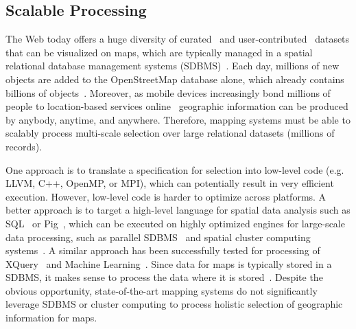 \documentclass[11pt, oneside]{report}
\begin{document}
{%
\subsection{Scalable Processing}
\label{sec:introduction:problem:statement:three}
The Web today offers a huge diversity of curated~\cite{gst2014digitalmapsupply} and user-contributed~\cite{openstreetmap,twitter2014twitter,zooniverse2014oldweather} datasets that can be visualized on maps, which are typically managed in a spatial relational database management systems (SDBMS)~\cite{wu2014case}. Each day, millions of new objects are added to the OpenStreetMap database alone, which already contains billions of objects~\cite{openstreetmap2014stats}. Moreover, as mobile devices increasingly bond millions of people to location-based services online~\cite{endomondo2014endomondo,tinder2014tinder,twitter2014twitter} geographic information can be produced by anybody, anytime, and anywhere. Therefore, mapping systems must be able to scalably process multi-scale selection over large relational datasets (millions of records).

One approach is to translate a specification for selection into low-level code (e.g. LLVM, C++, OpenMP, or MPI), which can potentially result in very efficient execution. However, low-level code is harder to optimize across platforms. A better approach is to target a high-level language for spatial data analysis such as SQL~\cite{postgis} or Pig~\cite{eldawy2014pigeon}, which can be executed on highly optimized engines for large-scale data processing, such as parallel SDBMS~\cite{waas2009beyond} and spatial cluster computing systems~\cite{aji2013hadoopgis,eldawy2014spatialhadoop}. A similar approach has been successfully tested for processing of XQuery~\cite{boncz2006monetdb} and Machine Learning~\cite{hellerstein12madlib}. Since data for maps is typically stored in a SDBMS, it makes sense to process the data where it is stored~\cite{grust2009ferry}. Despite the obvious opportunity, state-of-the-art mapping systems do not significantly leverage SDBMS or cluster computing to process holistic selection of geographic information for maps.

}
\end{document}
